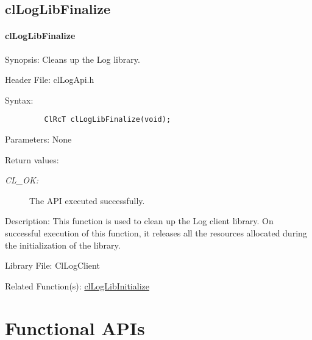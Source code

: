 \subsection{clLogLibFinalize}
\hypertarget{pagelog107}{}\paragraph{cl\-Log\-Lib\-Finalize}\label{pagelog107}
\begin{Desc}
\item[Synopsis:]Cleans up the Log library.\end{Desc}
\begin{Desc}
\item[Header File:]clLogApi.h\end{Desc}
\begin{Desc}
\item[Syntax:]

\footnotesize\begin{verbatim}         ClRcT clLogLibFinalize(void);
\end{verbatim}
\normalsize
\end{Desc}
\begin{Desc}
\item[Parameters:]None\end{Desc}
\begin{Desc}
\item[Return values:]
\begin{description}
\item[{\em CL\_\-OK:}]The API executed successfully.\end{description}
\end{Desc}
\begin{Desc}
\item[Description:]This function is used to clean up the Log client library. On successful execution of this function, it releases all the resources allocated during the initialization of the library.\end{Desc}
\begin{Desc}
\item[Library File:]Cl\-Log\-Client\end{Desc}
\begin{Desc}
\item[Related Function(s):]\hyperlink{group__group26}{cl\-Log\-Lib\-Initialize} \end{Desc}
\newpage


\section{Functional APIs}

